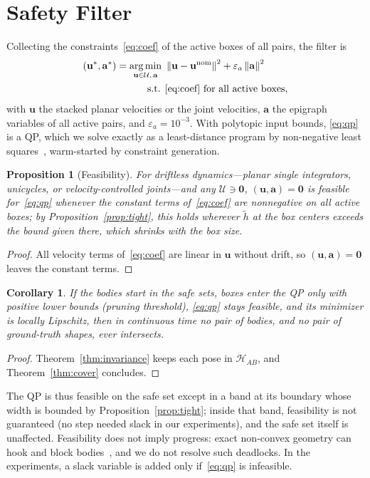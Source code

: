 \documentclass[journal]{IEEEtran}
\newtheorem{proposition}{Proposition}
\newtheorem{corollary}{Corollary}
\theoremstyle{definition}
\newcommand{\norm}[1]{\left\lVert #1\right\rVert}
\DeclareMathOperator*{\argmin}{arg\,min}
\begin{document}
\section{Safety Filter}\label{sec:filter}
Collecting the constraints~\eqref{eq:coef} of the active boxes of all pairs, the filter is
\begin{equation}\label{eq:qp}
\begin{aligned}
(\mathbf u^\ast,\mathbf a^\ast)=\argmin_{\mathbf u\in\mathcal U,\,\mathbf a}\ &\norm{\mathbf u-\mathbf u^{\rm nom}}^2+\varepsilon_a\norm{\mathbf a}^2\\
\text{s.t. }&\eqref{eq:coef}\ \text{for all active boxes},
\end{aligned}
\end{equation}
with $\mathbf u$ the stacked planar velocities or the joint velocities, $\mathbf a$ the epigraph
variables of all active pairs, and $\varepsilon_a=10^{-3}$. With
polytopic input bounds, \eqref{eq:qp} is a QP, which we solve exactly as a least-distance program by
non-negative least squares~\cite{lawson1995solving}, warm-started by constraint generation.
\begin{proposition}[Feasibility]\label{prop:feas}
For driftless dynamics---planar single integrators, unicycles, or velocity-controlled joints---and
any $\mathcal U\ni\mathbf 0$, $(\mathbf u,\mathbf a)=\mathbf 0$ is feasible for~\eqref{eq:qp} whenever
the constant terms of~\eqref{eq:coef} are nonnegative on all active boxes; by
Proposition~\ref{prop:tight}, this holds wherever $\tilde h$ at the box centers exceeds the bound given
there, which shrinks with the box size.
\end{proposition}
\begin{proof}
All velocity terms of~\eqref{eq:coef} are linear in $\mathbf u$ without drift, so
$(\mathbf u,\mathbf a)=\mathbf 0$ leaves the constant terms.
\end{proof}
\begin{corollary}\label{cor:closed}
If the bodies start in the safe sets, boxes enter the QP only with positive lower bounds (pruning
threshold), \eqref{eq:qp} stays feasible, and its minimizer is locally Lipschitz, then in continuous
time no pair of bodies, and no pair of ground-truth shapes, ever intersects.
\end{corollary}
\begin{proof}
Theorem~\ref{thm:invariance} keeps each pose in $\mathcal H_{AB}$, and Theorem~\ref{thm:cover}
concludes.
\end{proof}
The QP is thus feasible on the safe set except in a band at its boundary whose width is bounded by
Proposition~\ref{prop:tight}; inside that band, feasibility is not guaranteed (no step needed slack in our experiments),
and the safe set itself is unaffected.
Feasibility does not imply progress: exact non-convex geometry can hook and block
bodies~\cite{reis2020undesirable}, and we do not resolve such deadlocks. In the experiments, a slack
variable is added only if~\eqref{eq:qp} is infeasible.
\end{document}
